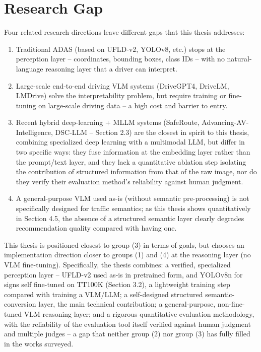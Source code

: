 \documentclass[12pt,a4paper]{report}
\begin{document}
\section{Research Gap}

Four related research directions leave different gaps that this thesis addresses:

\begin{enumerate}
    \item Traditional ADAS (based on UFLD-v2, YOLOv8, etc.) stops at the perception layer -- coordinates, bounding boxes, class IDs -- with no natural-language reasoning layer that a driver can interpret.
    \item Large-scale end-to-end driving VLM systems (DriveGPT4, DriveLM, LMDrive) solve the interpretability problem, but require training or fine-tuning on large-scale driving data -- a high cost and barrier to entry.
    \item Recent hybrid deep-learning + MLLM systems (SafeRoute, Advancing-AV-Intelligence, DSC-LLM -- Section 2.3) are the closest in spirit to this thesis, combining specialized deep learning with a multimodal LLM, but differ in two specific ways: they fuse information at the embedding layer rather than the prompt/text layer, and they lack a quantitative ablation step isolating the contribution of structured information from that of the raw image, nor do they verify their evaluation method's reliability against human judgment.
    \item A general-purpose VLM used as-is (without semantic pre-processing) is not specifically designed for traffic semantics; as this thesis shows quantitatively in Section 4.5, the absence of a structured semantic layer clearly degrades recommendation quality compared with having one.
\end{enumerate}

This thesis is positioned closest to group (3) in terms of goals, but chooses an implementation direction closer to groups (1) and (4) at the reasoning layer (no VLM fine-tuning). Specifically, the thesis combines: a verified, specialized perception layer -- UFLD-v2 used as-is in pretrained form, and YOLOv8n for signs self fine-tuned on TT100K (Section 3.2), a lightweight training step compared with training a VLM/LLM; a self-designed structured semantic-conversion layer, the main technical contribution; a general-purpose, non-fine-tuned VLM reasoning layer; and a rigorous quantitative evaluation methodology, with the reliability of the evaluation tool itself verified against human judgment and multiple judges -- a gap that neither group (2) nor group (3) has fully filled in the works surveyed.
\end{document}
